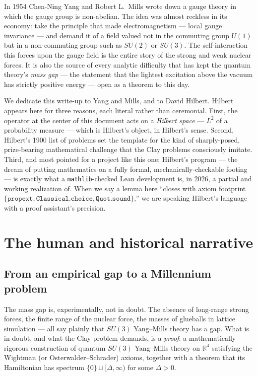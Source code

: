 \documentclass[11pt]{article}
\newcommand{\code}[1]{\texttt{#1}}
\begin{document}
In 1954 Chen-Ning Yang and Robert L.\ Mills wrote down a gauge theory
in which the gauge group is non-abelian. The idea was almost
reckless in its economy: take the principle that made
electromagnetism --- local gauge invariance --- and demand it of a
field valued not in the commuting group $U(1)$ but in a non-commuting
group such as $SU(2)$ or $SU(3)$. The self-interaction this forces
upon the gauge field is the entire story of the strong and weak
nuclear forces. It is also the source of every analytic difficulty
that has kept the quantum theory's \emph{mass gap} --- the statement
that the lightest excitation above the vacuum has strictly positive
energy --- open as a theorem to this day.

We dedicate this write-up to Yang and Mills, and to David Hilbert.
Hilbert appears here for three reasons, each literal rather than
ceremonial. First, the operator at the center of this document acts
on a \emph{Hilbert space} --- $L^2$ of a probability measure ---
which is Hilbert's object, in Hilbert's sense. Second, Hilbert's 1900
list of problems set the template for the kind of sharply-posed,
prize-bearing mathematical challenge that the Clay problems
consciously imitate. Third, and most pointed for a project like this
one: Hilbert's program --- the dream of putting mathematics on a
fully formal, mechanically-checkable footing --- is exactly what a
\code{mathlib}-checked Lean development is, in 2026, a partial and
working realization of. When we say a lemma here ``closes with axiom
footprint $\{\code{propext},\code{Classical.choice},
\code{Quot.sound}\}$,'' we are speaking Hilbert's language with a
proof assistant's precision.

\section{The human and historical narrative}

\subsection{From an empirical gap to a Millennium problem}

The mass gap is, experimentally, not in doubt. The absence of
long-range strong forces, the finite range of the nuclear force, the
masses of glueballs in lattice simulation --- all say plainly that
$SU(3)$ Yang--Mills theory has a gap. What is in doubt, and what the
Clay problem demands, is a \emph{proof}: a mathematically rigorous
construction of quantum $SU(3)$ Yang--Mills theory on $\mathbb{R}^4$
satisfying the Wightman (or Osterwalder--Schrader) axioms, together
with a theorem that its Hamiltonian has spectrum
$\{0\}\cup[\Delta,\infty)$ for some $\Delta>0$.
\end{document}
